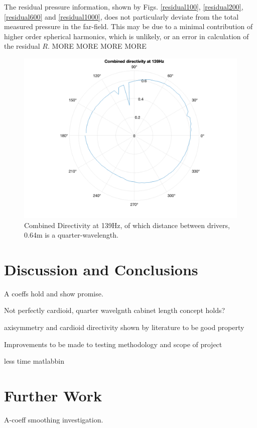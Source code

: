 \documentclass{report}
\begin{document}
            The residual pressure information, shown by Figs. \ref{residual100}, \ref{residual200}, \ref{residual600} and \ref{residual1000}, does not particularly deviate from the total measured pressure in the far-field.
            This may be due to a minimal contribution of higher order spherical harmonics, which is unlikely, or an error in calculation of the residual $R$.
            MORE MORE MORE MORE

            \begin{figure}[H]
                \centering
                \includegraphics[width=0.8\linewidth]{figs/combined139.png}
                \caption{Combined Directivity at 139Hz, of which distance between drivers, 0.64m is a quarter-wavelength.}
                \label{combined139}
            \end{figure}



\chapter{Discussion and Conclusions}
    A coeffs hold and show promise.

    Not perfectly cardioid, quarter wavelgnth cabinet length concept holds?

    axisymmetry and cardioid directivity shown by literature to be good property

    Improvements to be made to testing methodology and scope of project

    less time matlabbin
        

\chapter{Further Work}
    A-coeff smoothing investigation.
\end{document}

